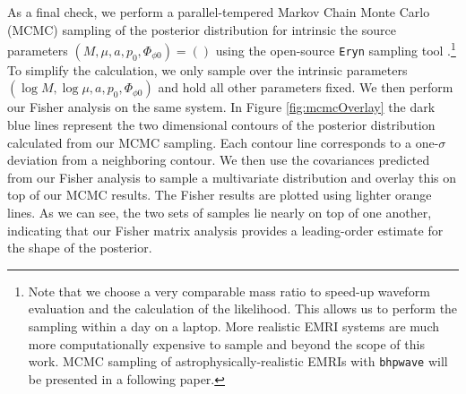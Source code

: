 \documentclass[%
 reprint,
 nofootinbib,
 amsmath,amssymb,
 aps,
 prd,
]{revtex4-2}
\begin{document}
As a final check, we perform a parallel-tempered Markov Chain Monte Carlo (MCMC) sampling of the posterior distribution for intrinsic the source parameters $(M, \mu, a, p_0, \Phi_{\phi0}) = ()$ using the open-source \texttt{Eryn} sampling tool \cite{ForeETC13, KarnETC23,Katz23}.\footnote{Note that we choose a very comparable mass ratio to speed-up waveform evaluation and the calculation of the likelihood. This allows us to perform the sampling within a day on a laptop. More realistic EMRI systems are much more computationally expensive to sample and beyond the scope of this work. MCMC sampling of astrophysically-realistic EMRIs with \texttt{bhpwave} will be presented in a following paper.} To simplify the calculation, we only sample over the intrinsic parameters $(\log M, \log \mu, a, p_0, \Phi_{\phi0})$ and hold all other parameters fixed. We then perform our Fisher analysis on the same system. In Figure \ref{fig:mcmcOverlay} the dark blue lines represent the two dimensional contours of the posterior distribution calculated from our MCMC sampling. Each contour line corresponds to a one-$\sigma$ deviation from a neighboring contour. We then use the covariances predicted from our Fisher analysis to sample a multivariate distribution and overlay this on top of our MCMC results. The Fisher results are plotted using lighter orange lines. As we can see, the two sets of samples lie nearly on top of one another, indicating that our Fisher matrix analysis provides a leading-order estimate for the shape of the posterior. 



\end{document}
